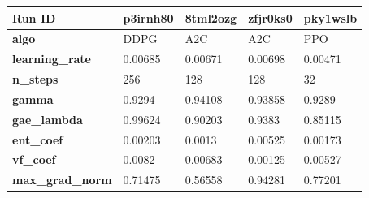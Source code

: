 \documentclass[../xlapes02]{subfiles}
\begin{document}
    \begin{table}[!ht]
        \centering
        {\footnotesize
            \begin{tabular}{|l||l|l||l|l|}
                \hline
                \textbf{Run ID}                    & p3irnh80                                     & 8tml2ozg                                     & zfjr0ks0                                     & pky1wslb                                     \\ \hline
                \textbf{algo}                      & DDPG                                         & A2C                                          & A2C                                          & PPO                                          \\ \hline
                \textbf{learning\_rate}            & 0.00685                                      & 0.00671                                      & 0.00698                                      & 0.00471                                      \\ \hline
                \textbf{n\_steps}                  & 256                                          & 128                                          & 128                                          & 32                                           \\ \hline
                \textbf{gamma}                     & 0.9294                                       & 0.94108                                      & 0.93858                                      & 0.9289                                       \\ \hline
                \textbf{gae\_lambda}               & 0.99624                                      & 0.90203                                      & 0.9383                                       & 0.85115                                      \\ \hline
                \textbf{ent\_coef}                 & 0.00203                                      & 0.0013                                       & 0.00525                                      & 0.00173                                      \\ \hline
                \textbf{vf\_coef}                  & 0.0082                                       & 0.00683                                      & 0.00125                                      & 0.00527                                      \\ \hline
                \textbf{max\_grad\_norm}           & 0.71475                                      & 0.56558                                      & 0.94281                                      & 0.77201                                      \\ \hline

\end{tabular}}
\end{table}
\end{document}
